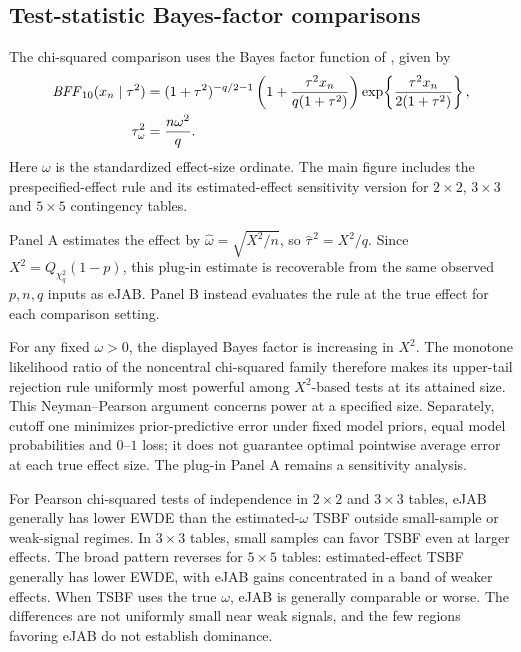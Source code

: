 \documentclass[11pt,letterpaper]{article}
\begin{document}
\subsection{Test-statistic Bayes-factor comparisons}
The chi-squared comparison uses the Bayes factor function of
\citet{johnson2023bff}, given by
\begin{align}
 \mathit{BFF}_{10}(x_n\mid\tau^2)
 &=(1+\tau^2)^{-q/2-1}
   \left(1+\frac{\tau^2x_n}{q(1+\tau^2)}\right)
   \exp\!\left\{\frac{\tau^2x_n}{2(1+\tau^2)}\right\},
 \label{eq:bff}\\
 \tau_\omega^2&=\frac{n\omega^2}{q}.
 \nonumber
\end{align}
Here \(\omega\) is the standardized effect-size ordinate. The main figure
includes the prespecified-effect rule and its estimated-effect
sensitivity version for \(2\times2\), \(3\times3\) and \(5\times5\)
contingency tables.

Panel A estimates the effect by \(\widehat\omega=\sqrt{X^2/n}\), so
\(\widehat\tau^{\,2}=X^2/q\). Since
\(X^2=Q_{\chi_q^2}(1-p)\), this plug-in estimate is recoverable from
the same observed \(p,n,q\) inputs as eJAB. Panel B instead evaluates
the rule at the true effect for each comparison setting.

For any fixed \(\omega>0\), the displayed Bayes factor is increasing
in \(X^2\). The monotone likelihood ratio of the noncentral chi-squared
family therefore makes its upper-tail rejection rule uniformly most
powerful among \(X^2\)-based tests at its attained size. This
Neyman--Pearson argument \citep{fowlie2021neyman} concerns power at a
specified size. Separately, cutoff one minimizes prior-predictive error
under fixed model priors, equal model probabilities and \(0\)--\(1\)
loss; it does not guarantee optimal pointwise average error at each true
effect size. The plug-in Panel A remains a sensitivity analysis.

For Pearson chi-squared tests of independence in \(2\times2\) and
\(3\times3\) tables, eJAB generally has lower EWDE than the
estimated-\(\omega\) TSBF outside small-sample or weak-signal regimes.
In \(3\times3\) tables, small samples can favor TSBF even at larger
effects. The broad pattern reverses for \(5\times5\) tables: estimated-effect
TSBF generally has lower EWDE, with eJAB gains concentrated in a band of
weaker effects. When TSBF uses the true \(\omega\), eJAB is generally
comparable or worse. The differences are not uniformly small near weak
signals, and the few regions favoring eJAB do not establish dominance.
\end{document}
